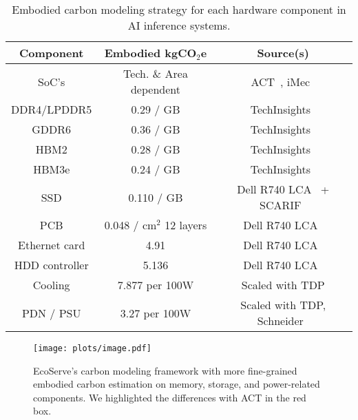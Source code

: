 

\begin{table}[t]
    \centering \footnotesize
\begin{tabular}{ccc}\toprule
\textbf{Component} &\textbf{ Embodied kgCO$_2$e } & \textbf{Source(s)} \\ 
\midrule
SoC's & Tech. \& Area dependent & ACT~\cite{ACT}, iMec~\cite{imec-dtco20} \\ 
DDR4/LPDDR5 & 0.29 / GB& TechInsights~\cite{TechInsights} \\ 
GDDR6 & 0.36 / GB& TechInsights~\cite{TechInsights} \\ 
HBM2 & 0.28 / GB & TechInsights~\cite{TechInsights} \\ 
HBM3e & 0.24 / GB & TechInsights~\cite{TechInsights} \\ 
SSD & 0.110 / GB & Dell R740 LCA~\cite{dellr740} + SCARIF~\cite{SCARIF}\\ 
PCB & 0.048 / cm$^2$ 12 layers & Dell R740 LCA~\cite{dellr740}\\ 
Ethernet card &4.91 & Dell R740 LCA~\cite{dellr740} \\ 
HDD controller & 5.136 & Dell R740 LCA~\cite{dellr740} \\ 
Cooling & 7.877 per 100W & Scaled with TDP\cite{SCARIF} \\ 
PDN / PSU & 3.27 per 100W  & Scaled with TDP, Schneider~\cite{se_lifecycle_calculator} \\ \bottomrule
\end{tabular}
    \caption{Embodied carbon modeling strategy for each hardware component in AI inference systems. }
    \label{tab:model}
\vspace{-4em}
\end{table}


\begin{figure*}[t]
    \centering
\texttt{[image: plots/image.pdf]}
    \caption{EcoServe's carbon modeling framework with more fine-grained embodied carbon estimation on memory, storage, and power-related components. We highlighted the differences with ACT in the red box.}
    \label{fig:framework}
\end{figure*}



